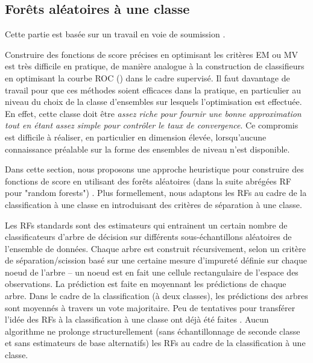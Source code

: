 \documentclass[a4paper, 12pt]{article}
\begin{document}
\subsection{Forêts aléatoires à une classe}
\label{resume_fr:ocrf}
Cette partie est basée sur un travail en voie de soumission \citep{OCRF16}.


Construire des fonctions de score précises en optimisant les critères EM ou MV est très difficile en pratique, de manière analogue à la construction de classifieurs en optimisant la courbe ROC (\cite{Clemencon2010}) dans le cadre supervisé.
%
Il faut davantage de travail pour que ces méthodes soient efficaces dans la pratique, en particulier au niveau du  choix de la classe d'ensembles sur lesquels l'optimisation est effectuée.
En effet, cette classe doit être \emph{assez riche pour fournir une bonne approximation tout en étant assez simple pour contrôler le taux de convergence}. Ce compromis est difficile à réaliser, en particulier en dimension élevée, lorsqu'aucune connaissance préalable sur la forme des ensembles de niveau n'est disponible.

Dans cette section, nous proposons une approche heuristique pour construire des fonctions de score en utilisant des forêts aléatoires (dans la suite abrégées RF pour "random forests") \citep{Breiman2001, Genuer2008, Biau2008, Biau2016}.
Plus formellement, nous adaptons les RFs au cadre de la classification à une classe en introduisant des critères de séparation à une classe.

Les RFs standards sont des estimateurs qui entrainent un certain nombre de classificateurs d'arbre de décision sur différents sous-échantillons aléatoires de l'ensemble de données. Chaque arbre est construit récursivement, selon un critère de séparation/scission basé sur une certaine mesure d'impureté définie sur chaque noeud de l'arbre -- un noeud est en fait une cellule rectangulaire de l'espace des observations. La prédiction est faite en moyennant les prédictions de chaque arbre. Dans le cadre de la classification (à deux classes), les prédictions des arbres sont moyennés à travers un vote majoritaire. Peu de tentatives pour transférer l'idée des RFs à la classification à une classe ont déjà été faites \citep{Desir12, Liu2008, Shi2012}. Aucun algorithme ne prolonge structurellement (sans échantillonnage de seconde classe et sans estimateurs de base alternatifs) les RFs au cadre de la classification à une classe.
\end{document}
